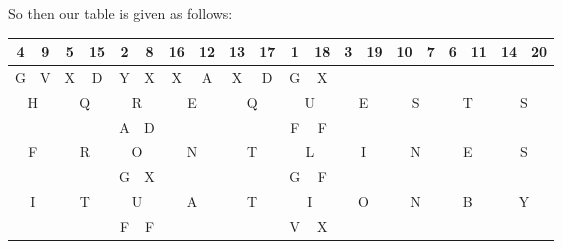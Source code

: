 \documentclass[11pt]{article}
\theoremstyle{definition}\newtheorem{definition}{Definition}
\theoremstyle{definition}\newtheorem{example}{Example}
\theoremstyle{definition}\newtheorem{samplecode}{Sample Code}
\begin{document}
So then our table is given as follows:
\begin{center}
    \begin{tabular}{|cc|cc|cc|cc|cc|cc|cc|cc|cc|cc|} \hline
        4 & 9 & 5 & 15 & 2 & 8 & 16 & 12 & 13 & 17 & 1 & 18 & 3 & 19 & 10 & 7 & 6 & 11 & 14 & 20 \\ \hline\hline
        \multicolumn{1}{|c|}{G} & V & \multicolumn{1}{c|}{X} & D & \multicolumn{1}{c|}{Y} & X & \multicolumn{1}{c|}{X} & A & \multicolumn{1}{c|}{X} & D & \multicolumn{1}{c|}{G} & X & \multicolumn{1}{c|}{} &  & \multicolumn{1}{c|}{} &  & \multicolumn{1}{c|}{} &  & \multicolumn{1}{c|}{} &  \\ \hline
        \multicolumn{2}{|c|}{H}   & \multicolumn{2}{c|}{Q}   & \multicolumn{2}{c|}{R}   & \multicolumn{2}{c|}{E}   & \multicolumn{2}{c|}{Q}   & \multicolumn{2}{c|}{U}   & \multicolumn{2}{c|}{E}   & \multicolumn{2}{c|}{S}   & \multicolumn{2}{c|}{T}   & \multicolumn{2}{c|}{S}   \\ \hline
        \multicolumn{1}{|c|}{} &  & \multicolumn{1}{c|}{} &  & \multicolumn{1}{c|}{A} & D & \multicolumn{1}{c|}{} &  & \multicolumn{1}{c|}{} &  & \multicolumn{1}{c|}{F} & F & \multicolumn{1}{c|}{} &  & \multicolumn{1}{c|}{} &  & \multicolumn{1}{c|}{} &  & \multicolumn{1}{c|}{} &  \\ \hline
        \multicolumn{2}{|c|}{F}   & \multicolumn{2}{c|}{R}   & \multicolumn{2}{c|}{O}   & \multicolumn{2}{c|}{N}   & \multicolumn{2}{c|}{T}   & \multicolumn{2}{c|}{L}   & \multicolumn{2}{c|}{I}   & \multicolumn{2}{c|}{N}   & \multicolumn{2}{c|}{E}   & \multicolumn{2}{c|}{S}   \\ \hline
        \multicolumn{1}{|c|}{} &  & \multicolumn{1}{c|}{} &  & \multicolumn{1}{c|}{G} & X & \multicolumn{1}{c|}{} &  & \multicolumn{1}{c|}{} &  & \multicolumn{1}{c|}{G} & F & \multicolumn{1}{c|}{} &  & \multicolumn{1}{c|}{} &  & \multicolumn{1}{c|}{} &  & \multicolumn{1}{c|}{} &  \\ \hline
        \multicolumn{2}{|c|}{I}   & \multicolumn{2}{c|}{T}   & \multicolumn{2}{c|}{U}   & \multicolumn{2}{c|}{A}   & \multicolumn{2}{c|}{T}   & \multicolumn{2}{c|}{I}   & \multicolumn{2}{c|}{O}   & \multicolumn{2}{c|}{N}   & \multicolumn{2}{c|}{B}   & \multicolumn{2}{c|}{Y}   \\ \hline
        \multicolumn{1}{|c|}{} &  & \multicolumn{1}{c|}{} &  & \multicolumn{1}{c|}{F} & F & \multicolumn{1}{c|}{} &  & \multicolumn{1}{c|}{} &  & \multicolumn{1}{c|}{V} & X & \multicolumn{1}{c|}{} &  & \multicolumn{1}{c|}{} &  & \multicolumn{1}{c|}{} &  & \multicolumn{1}{c|}{} &  \\ \hline

\end{tabular}
\end{center}
\end{document}
